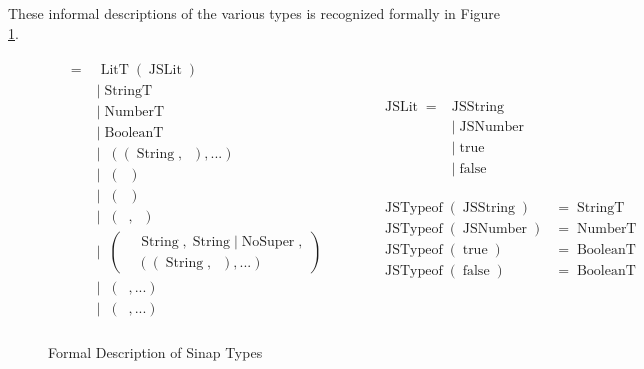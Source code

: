 \documentclass{article}
\DeclareMathOperator{\StringT}{StringT}
\DeclareMathOperator{\NumberT}{NumberT}
\DeclareMathOperator{\BooleanT}{BooleanT}
\DeclareMathOperator{\LitT}{LitT}
\DeclareMathOperator{\JSLit}{JSLit}
\DeclareMathOperator{\JSTypeof}{JSTypeof}
\DeclareMathOperator{\RecT}{RecT_\Gamma}
\DeclareMathOperator{\ObjT}{ObjT_\Gamma}
\DeclareMathOperator{\ListT}{ListT_\Gamma}
\DeclareMathOperator{\SetT}{SetT_\Gamma}
\DeclareMathOperator{\MapT}{MapT_\Gamma}
\DeclareMathOperator{\UnionT}{UnionT_\Gamma}
\DeclareMathOperator{\InterT}{InterT_\Gamma}
\DeclareMathOperator{\String}{String}
\DeclareMathOperator{\Type}{{Type_\Gamma}}
\DeclareMathOperator{\NoSuper}{NoSuper}
\begin{document}
These informal descriptions of the various types is recognized formally 
in Figure \ref{sinap-types-model}.

\begin{figure}
\begin{mdframed}
\begin{align*}
\begin{aligned}
\Type = &\LitT(\JSLit) \\
&|\StringT \\
&|\NumberT \\
&|\BooleanT \\
&|\RecT((\String, \Type), ...) \\
&|\ListT(\Type) \\
&|\SetT(\Type) \\
&|\MapT(\Type, \Type) \\
&|\ObjT\left(\begin{aligned}
    &\String, \String | \NoSuper, \\
&((\String, \Type), ...)
\end{aligned}\right) \\
&|\InterT(\ObjT, ...) \\
&|\UnionT(\Type, ...)\\
\end{aligned}
\quad\quad\quad\begin{aligned}        
\begin{aligned}
\JSLit = &\operatorname{JSString} \\
&| \operatorname{JSNumber} \\
&| \operatorname{true} \\
&| \operatorname{false} \\
\end{aligned}\\\\
\begin{aligned}
\JSTypeof(\operatorname{JSString}) &= \StringT \\
\JSTypeof(\operatorname{JSNumber}) &= \NumberT \\
\JSTypeof(\operatorname{true}) &= \BooleanT \\
\JSTypeof(\operatorname{false}) &= \BooleanT \\
\end{aligned}  
\end{aligned}  
\end{align*}
\end{mdframed}
\caption{Formal Description of Sinap Types}
\label{sinap-types-model}
\end{figure}
\end{document}
